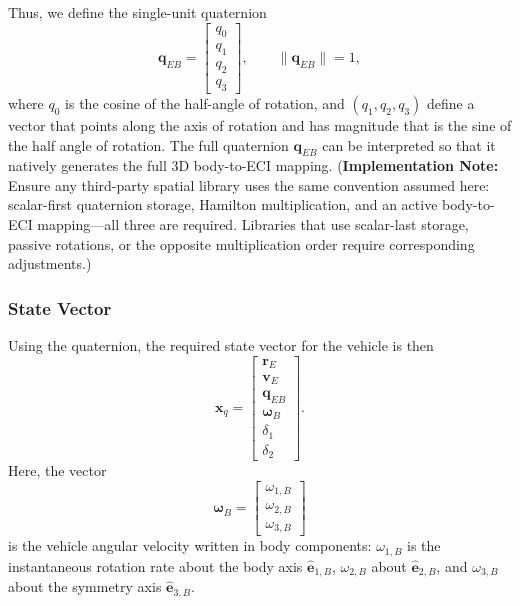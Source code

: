 Thus, we define the single-unit quaternion  
\begin{equation}
\mathbf q_{EB}=
\begin{bmatrix}
q_0\\ q_1\\ q_2\\ q_3
\end{bmatrix},
\qquad
\|\mathbf q_{EB}\|=1, \label{eq:quaternion_def}
\end{equation}
where \(q_0\) is the cosine of the half-angle of rotation, and \((q_1, q_2, q_3)\) define a vector that points along the axis of rotation and has magnitude that is the sine of the half angle of rotation. The full quaternion \(\mathbf q_{EB}\) can be interpreted so that it natively generates the full 3D body-to-ECI mapping. (\textbf{Implementation Note:} Ensure any third-party spatial library uses the same convention assumed here: scalar-first quaternion storage, Hamilton multiplication, and an active body-to-ECI mapping---all three are required. Libraries that use scalar-last storage, passive rotations, or the opposite multiplication order require corresponding adjustments.)

\subsubsection{State Vector}
Using the quaternion, the required state vector for the vehicle is then
\begin{equation}
\mathbf x_q =
\begin{bmatrix}
\mathbf r_E\\
\mathbf v_E\\
\mathbf q_{EB}\\
\boldsymbol\omega_{B}\\
\delta_1\\
\delta_2
\end{bmatrix}. \label{eq:state_vector}
\end{equation}
Here, the vector
\begin{equation}
\boldsymbol\omega_B=
\begin{bmatrix}
\omega_{1,B}\\[2pt]\omega_{2,B}\\[2pt]\omega_{3,B}
\end{bmatrix}
\end{equation}
is the vehicle angular velocity written in body components: \(\omega_{1,B}\) is the instantaneous rotation rate about the body axis \(\hat{\mathbf e}_{1,B}\), \(\omega_{2,B}\) about \(\hat{\mathbf e}_{2,B}\), and \(\omega_{3,B}\) about the symmetry axis \(\hat{\mathbf e}_{3,B}\). 


